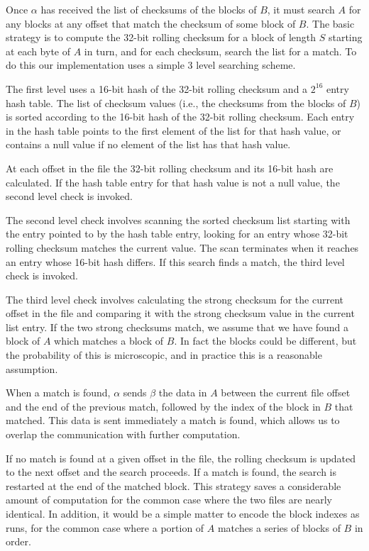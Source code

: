 \documentclass[a4paper]{article}
\begin{document}
Once $\alpha$ has received the list of checksums of the blocks of $B$,
it must search $A$ for any blocks at any offset that match the
checksum of some block of $B$.  The basic strategy is to compute the
32-bit rolling checksum for a block of length $S$ starting at each
byte of $A$ in turn, and for each checksum, search the list for a
match.  To do this our implementation uses a
simple 3 level searching scheme.

The first level uses a 16-bit hash of the 32-bit rolling checksum and
a $2^{16}$ entry hash table.  The list of checksum values (i.e., the
checksums from the blocks of $B$) is sorted according to the 16-bit
hash of the 32-bit rolling checksum.  Each entry in the hash table
points to the first element of the list for that hash value, or
contains a null value if no element of the list has that hash value.

At each offset in the file the 32-bit rolling checksum and its 16-bit
hash are calculated.  If the hash table entry for that hash value is
not a null value, the second level check is invoked.

The second level check involves scanning the sorted checksum list
starting with the entry pointed to by the hash table entry, looking
for an entry whose 32-bit rolling checksum matches the current value.
The scan terminates when it reaches an entry whose 16-bit hash
differs.  If this search finds a match, the third level check is
invoked.

The third level check involves calculating the strong checksum for the
current offset in the file and comparing it with the strong checksum
value in the current list entry.  If the two strong checksums match,
we assume that we have found a block of $A$ which matches a block of
$B$.  In fact the blocks could be different, but the probability of
this is microscopic, and in practice this is a reasonable assumption.

When a match is found, $\alpha$ sends $\beta$ the data in $A$ between
the current file offset and the end of the previous match, followed by
the index of the block in $B$ that matched.  This data is sent
immediately a match is found, which allows us to overlap the
communication with further computation.

If no match is found at a given offset in the file, the rolling
checksum is updated to the next offset and the search proceeds.  If a
match is found, the search is restarted at the end of the matched
block.  This strategy saves a considerable amount of computation for
the common case where the two files are nearly identical.  In
addition, it would be a simple matter to encode the block indexes as
runs, for the common case where a portion of $A$ matches a series of
blocks of $B$ in order.
\end{document}
